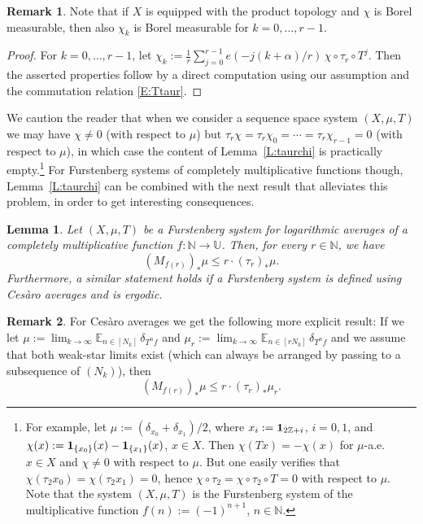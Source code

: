 \documentclass[11pt]{amsart}
\newtheorem{lemma}{Lemma}[section]
\theoremstyle{definition}
\newtheorem*{remark}{Remark}
\newcommand{\E}{{\mathbb E}}
\newcommand{\N}{{\mathbb N}}
\newcommand{\Z}{{\mathbb Z}}
\newcommand{\U}{{\mathbb U}}
\begin{document}
\begin{remark}
	Note that if  $X$ is equipped with the product topology and  $\chi$ is Borel measurable, then also $\chi_k$ is Borel measurable for $k=0,\ldots, r-1$.
\end{remark}
\begin{proof}
	For $k=0,\ldots, r-1$, let $\chi_k:=\frac{1}{r}\sum_{j=0}^{r-1}e(-j(k+\alpha)/r) \, \chi\circ \tau_r\circ T^j$.
	Then the asserted properties follow by a direct computation  using our assumption and the  commutation relation \eqref{E:Ttaur}.
\end{proof}
We caution the reader  that when we consider a sequence space system $(X,\mu,T)$ we may have $\chi\neq 0$ (with respect to $\mu$) but  $\tau_r\chi=\tau_r \chi_0=\cdots =\tau_r\chi_{r-1}=0$  (with respect to $\mu$), in which case the content of Lemma~\ref{L:taurchi}  is practically empty.\footnote{For example, let  $\mu:=(\delta_{x_0}+\delta_{x_1})/2$, where $x_i:={\bf 1}_{2\Z+i}$, $i=0,1$,  and
	$\chi(x):={\bf 1}_{\{x_0\}}(x)-{\bf 1}_{\{x_1\}}(x)$, $x\in X$. Then  $\chi(Tx)=-\chi(x)$ for $\mu$-a.e.\ $x\in X$ and $\chi\neq 0$
 with respect to $\mu$. But one easily verifies that $\chi(\tau_2 x_0)=\chi(\tau_2x_1)=0$, hence $\chi\circ\tau_2=\chi\circ\tau_2\circ T=0$  with respect to $\mu$. Note that the system $(X,\mu,T)$ is the Furstenberg system of the multiplicative function $f(n):=(-1)^{n+1}$, $n\in \N$. }
For Furstenberg systems of completely multiplicative functions though, Lemma~\ref{L:taurchi} can be combined with the next result that alleviates this problem, in order  to get interesting consequences.
\begin{lemma}\label{L:abscont}
	Let $(X,\mu,T)$ be a Furstenberg system for logarithmic averages of a completely multiplicative function $f\colon \N\to \U$. Then, for every  $r\in \N$,   we have
	$$
(M_{f(r)})_* \mu\leq r\cdot 	(\tau_r)_*\mu.
	$$
	Furthermore, a similar statement holds if a Furstenberg system is defined using Ces\`aro averages and is ergodic.
\end{lemma}
\begin{remark}
	For Ces\`aro averages we get the following more explicit result:  If we let
	$\mu:=\lim_{k\to\infty} \E_{n\in [N_k]} \, \delta_{T^n f}$ and $\mu_r:=\lim_{k\to\infty} \E_{n\in [rN_k]} \, \delta_{T^n f}$ and  we assume that both weak-star limits exist (which can always be arranged by passing to a subsequence of $(N_k)$), then $$
	(M_{f(r)})_* \mu\leq r\cdot 	(\tau_r)_*\mu_r.
	$$
\end{remark}
\end{document}
